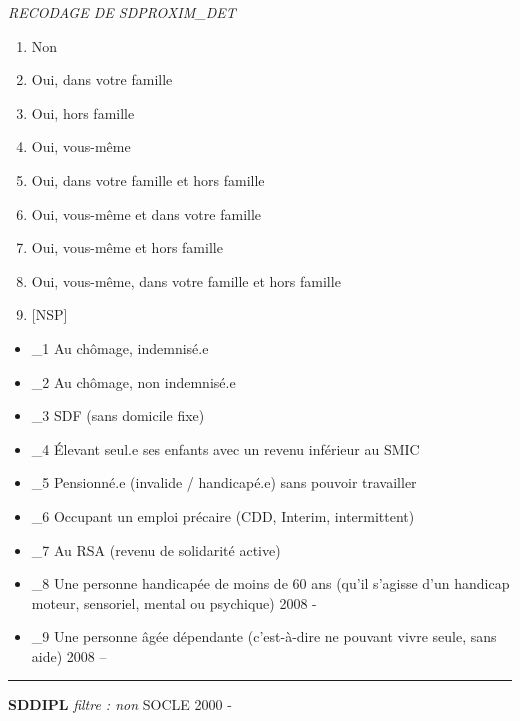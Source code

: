 \documentclass[12pt,a4paper]{reedthesis}
\providecommand{\tightlist}{%
  \setlength{\itemsep}{0pt}\setlength{\parskip}{0pt}}
\begin{document}
\emph{RECODAGE DE SDPROXIM\_DET}
\begin{enumerate}
\def\labelenumi{\arabic{enumi}.}
\tightlist
\item
  Non
\item
  Oui, dans votre famille
\item
  Oui, hors famille
\item
  Oui, vous-même
\item
  Oui, dans votre famille et hors famille
\item
  Oui, vous-même et dans votre famille
\item
  Oui, vous-même et hors famille
\item
  Oui, vous-même, dans votre famille et hors famille
\item
  {[}NSP{]}
\end{enumerate}
\begin{itemize}
\tightlist
\item
  \_1 Au chômage, indemnisé.e
\item
  \_2 Au chômage, non indemnisé.e
\item
  \_3 SDF (sans domicile fixe)
\item
  \_4 Élevant seul.e ses enfants avec un revenu inférieur au SMIC
\item
  \_5 Pensionné.e (invalide / handicapé.e) sans pouvoir travailler
\item
  \_6 Occupant un emploi précaire (CDD, Interim, intermittent)
\item
  \_7 Au RSA (revenu de solidarité active)
\item
  \_8 Une personne handicapée de moins de 60 ans (qu'il s'agisse d'un handicap moteur, sensoriel, mental ou psychique) 2008 -
\item
  \_9 Une personne âgée dépendante (c'est-à-dire ne pouvant vivre seule, sans aide) 2008 --
\end{itemize}
\begin{center}\rule{0.5\linewidth}{0.5pt}\end{center}

\textbf{SDDIPL} \emph{filtre : non} SOCLE 2000 -
\end{document}
